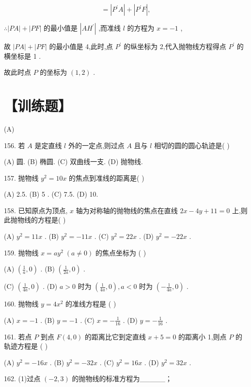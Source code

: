 \documentclass[10pt]{article}
\begin{document}
\[
= \left| {{P}^{\prime }A}\right|  + \left| {{P}^{\prime }F}\right| ,
\]

\(\therefore \left| {PA}\right|  + \left| {PF}\right|\) 的最小值是 \(\left| {A{H}^{\prime }}\right|\) ,而准线 \(l\) 的方程为 \(x =  - 1\) ,

故 \(\left| {PA}\right|  + \left| {PF}\right|\) 的最小值是 4,此时,点 \({P}^{\prime }\) 的纵坐标为 2,代入抛物线方程得点 \({P}^{\prime }\) 的横坐标是 1 .

故此时点 \(P\) 的坐标为 \(\left( {1,2}\right)\) .

\section*{【训练题】}

(A)

156. 若 \(A\) 是定直线 \(l\) 外的一定点,则过点 \(A\) 且与 \(l\) 相切的圆的圆心轨迹是( )

(A) 圆. (B) 椭圆. (C) 双曲线一支. (D) 抛物线.

157. 抛物线 \({y}^{2} = {10x}\) 的焦点到准线的距离是( )

(A) 2.5. (B) 5 . (C) 7.5. (D) 10.

158. 已知原点为顶点, \(x\) 轴为对称轴的抛物线的焦点在直线 \({2x} - {4y} + {11} = 0\) 上,则此抛物线的方程是( )

(A) \({y}^{2} = {11x}\) . (B) \({y}^{2} =  - {11x}\) . (C) \({y}^{2} = {22x}\) . (D) \({y}^{2} =  - {22x}\) .

159. 抛物线 \(x = a{y}^{2}\;\left( {a \neq  0}\right)\) 的焦点坐标为 ( )

(A) \(\left( {\frac{1}{a},0}\right)\) . (B) \(\left( {\frac{1}{2a},0}\right)\) .

(C) \(\left( {\frac{1}{4a},0}\right)\) . (D) \(a > 0\) 时为 \(\left( {\frac{1}{4a},0}\right) ,a < 0\) 时为 \(\left( {-\frac{1}{4a},0}\right)\) .

160. 抛物线 \(y = 4{x}^{2}\) 的准线方程是 ( )

(A) \(x =  - 1\) . (B) \(y =  - 1\) . (C) \(x =  - \frac{1}{16}\) . (D) \(y =  - \frac{1}{16}\) .

161. 若点 \(P\) 到点 \(F\left( {4,0}\right)\) 的距离比它到定直线 \(x + 5 = 0\) 的距离小 1,则点 \(P\) 的轨迹方程是 ( )

(A) \({y}^{2} =  - {16x}\) . (B) \({y}^{2} =  - {32x}\) . (C) \({y}^{2} = {16x}\) . (D) \({y}^{2} = {32x}\) .

162. (1)过点 \(\left( {-2,3}\right)\) 的抛物线的标准方程为\_\_\_\_\_；
\end{document}
